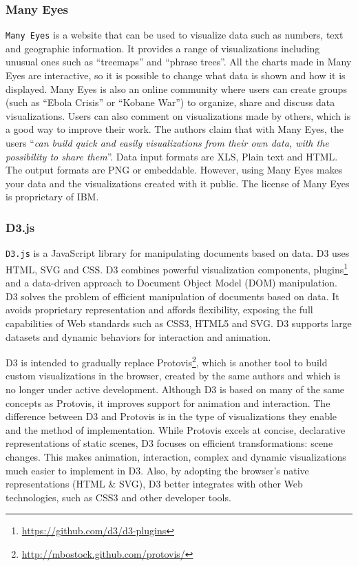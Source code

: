 \subsubsection{Many Eyes}
\label{sec:manyEyes}
\texttt{Many Eyes} \cite{ibm2010} is a website that can be used to visualize data such as numbers, text and geographic information. It provides a range of visualizations including unusual ones such as ``treemaps''  and ``phrase trees''. All the charts made in Many Eyes are interactive, so it is possible to change what data is shown and how it is displayed. Many Eyes is also an online community where users can create groups (such as ``Ebola Crisis'' or ``Kobane War'') to organize, share and discuss data visualizations. Users can also comment on visualizations made by others, which is a good way to improve their work. The authors claim that with Many Eyes, the users ``\textit{can build quick and easily visualizations from their own data, with the possibility to share them}''. Data input formats are XLS, Plain text and HTML. The output formats are PNG or embeddable. However, using Many Eyes makes  your data and the visualizations created with it public. The license of Many Eyes is proprietary of IBM.

\subsubsection{D3.js}
\label{sec:d3js}

\texttt{D3.js} \cite{d3js} is a JavaScript library for manipulating documents based on data. D3 uses HTML, SVG and CSS. D3 combines powerful visualization components, plugins\footnote{\url{https://github.com/d3/d3-plugins}}  and a data-driven approach to Document Object Model (DOM) manipulation. D3 solves the problem of efficient manipulation of documents based on data. It avoids proprietary representation and affords flexibility, exposing the full capabilities of Web standards such as CSS3, HTML5 and SVG. D3 supports large datasets and dynamic behaviors for interaction and animation.

D3 is intended to gradually replace Protovis\footnote{\url{http://mbostock.github.com/protovis/}}, which is another tool to build custom visualizations in the browser, created by the same authors and which is no longer under active development. Although D3 is based on many of the same concepts as Protovis, it improves support for animation and interaction. The difference between D3 and Protovis  is in the type of visualizations they enable and the method of implementation. While Protovis excels at concise, declarative representations of static scenes, D3 focuses on efficient transformations: scene changes. This makes animation, interaction, complex and dynamic visualizations much easier to implement in D3. Also, by adopting the browser's native representations (HTML \& SVG), D3 better integrates with other Web technologies, such as CSS3 and other developer tools.

